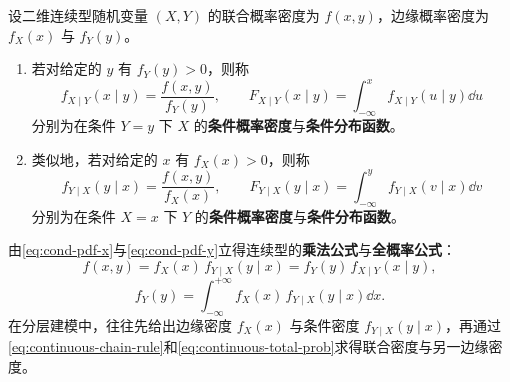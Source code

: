 \begin{definition}[连续型条件概率密度与条件分布函数]
\label{def:continuous-conditional}
设二维连续型随机变量 $(X,Y)$ 的联合概率密度为 $f(x,y)$，边缘概率密度为 $f_X(x)$ 与 $f_Y(y)$。
\begin{enumerate}
  \item 若对给定的 $y$ 有 $f_Y(y)>0$，则称
  \begin{equation}
    f_{X\mid Y}(x\mid y)=\frac{f(x,y)}{f_Y(y)},\qquad
    F_{X\mid Y}(x\mid y)=\int_{-\infty}^{x}f_{X\mid Y}(u\mid y)\dd u
    \label{eq:cond-pdf-x}
  \end{equation}
  分别为在条件 $Y=y$ 下 $X$ 的\textbf{条件概率密度}与\textbf{条件分布函数}。
  \item 类似地，若对给定的 $x$ 有 $f_X(x)>0$，则称
  \begin{equation}
    f_{Y\mid X}(y\mid x)=\frac{f(x,y)}{f_X(x)},\qquad
    F_{Y\mid X}(y\mid x)=\int_{-\infty}^{y}f_{Y\mid X}(v\mid x)\dd v
    \label{eq:cond-pdf-y}
  \end{equation}
  分别为在条件 $X=x$ 下 $Y$ 的\textbf{条件概率密度}与\textbf{条件分布函数}。
\end{enumerate}
\end{definition}

由\eqref{eq:cond-pdf-x}与\eqref{eq:cond-pdf-y}立得连续型的\textbf{乘法公式}与\textbf{全概率公式}：
\begin{equation}
  f(x,y)=f_X(x)\,f_{Y\mid X}(y\mid x)=f_Y(y)\,f_{X\mid Y}(x\mid y),
  \label{eq:continuous-chain-rule}
\end{equation}
\begin{equation}
  f_Y(y)=\int_{-\infty}^{+\infty}f_X(x)\,f_{Y\mid X}(y\mid x)\dd x.
  \label{eq:continuous-total-prob}
\end{equation}
在分层建模中，往往先给出边缘密度 $f_X(x)$ 与条件密度 $f_{Y\mid X}(y\mid x)$，再通过\eqref{eq:continuous-chain-rule}和\eqref{eq:continuous-total-prob}求得联合密度与另一边缘密度。

